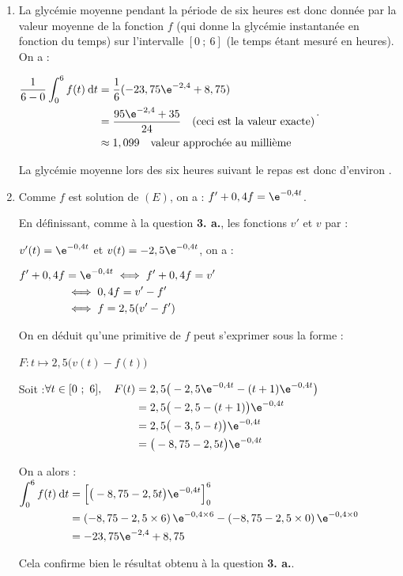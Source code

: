 \begin{enumerate}
\begin{enumerate}
\item La glycémie moyenne pendant la période de six heures est donc donnée par la valeur moyenne de la fonction $f$ (qui donne la glycémie instantanée en fonction du temps) sur l'intervalle $[0 ~;~ 6]$ (le temps étant mesuré en heures). On a :

$\begin{aligned}
\dfrac{1}{6-0}\displaystyle\int_0^6 f(t)\: \text{d}t
	&= \dfrac{1}{6}(-23,75\e^{-2,4} + 8,75) \\
	&= \dfrac{95\e^{-2,4} + 35}{24} \quad \text{(ceci est la valeur exacte)}\\
	&\approx 1,099 \quad \text{valeur approchée au millième }
\end{aligned}$.

La glycémie moyenne lors des six heures suivant le repas est donc d'environ .

\item Comme $f$ est solution de $(E)$, on a : $f' + 0,4f = \e^{-0,4t}$.

En définissant, comme à la question \textbf{3. a.}, les fonctions $v'$ et $v$ par :

$v'(t) =\e^{-0,4t}$ et $v(t) = -2,5\e^{-0,4t}$, on a :

$\begin{aligned}
f' + 0,4f &= \e^{-0,4t} \iff f' + 0,4f = v'\\
	&\iff 0,4f = v'  - f'\\
	&\iff f = 2,5 (v' - f')
\end{aligned}$

On en déduit qu'une primitive de $f$ peut s'exprimer sous la forme :

$F : t \longmapsto 2,5\big(v(t) - f(t)\big)$

Soit :\quad $\begin{aligned}[t]
\forall t \in [0~;~6],\quad F(t) &= 2,5\big(-2,5\e^{-0,4t} - (t+1)\e^{-0,4t}\big)\\
	&= 2,5\big(-2,5 - (t+1)\big)\e^{-0,4t}\\
	&= 2,5\big(-3,5 - t)\big)\e^{-0,4t}\\
	&= \big(-8,75 - 2,5t\big)\e^{-0,4t}\\
\end{aligned}$

On a alors : \quad $\begin{aligned}[t]
\displaystyle\int_0^6 f(t)\: \text{d}t
	&= \Big[\big(-8,75 - 2,5t\big)\e^{-0,4t}\Big]_0^6\\
	&= \left(-8,75 - 2,5\times 6\right)\e^{-0,4\times 6}  - \left(-8,75 - 2,5\times 0\right)\e^{-0,4\times 0}\\
	&= -23,75\e^{-2,4} + 8,75
\end{aligned}$

Cela confirme bien le résultat obtenu à la question \textbf{3. a.}.
	\end{enumerate}
\end{enumerate}
